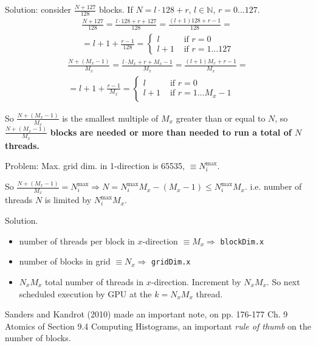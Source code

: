 \documentclass[10pt]{amsart}
\begin{document}
\begin{multicols*}{2}
Solution: consider $\frac{N+127}{128}$ blocks.  If $N = l\cdot 128 + r$, $l\in \mathbb{N}$, $r = 0 \dots 127$.
\[
\begin{gathered}
	\frac{N+127}{128} = \frac{ l \cdot 128 + r + 127 }{128} = \frac{ (l+1)128 + r- 1}{128} = \\
	= l+1 + \frac{r-1}{128} = \begin{cases}
		l & \text{ if } r= 0 \\
		l+1 & \text{ if } r = 1 \dots 127
	\end{cases}
\end{gathered}
\]
\[
\begin{gathered}
	\frac{ N + (M_x - 1) }{M_x} = \frac{ l\cdot M_x + r+ M_x - 1}{M_x} = \frac{ (l+1)M_x + r-1 }{M_x} = \\
	= l+1 + \frac{r-1}{M_x} = \begin{cases}
		l & \text{ if } r = 0 \\
		l +1 & \text{ if } r = 1 \dots M_x -1 
	\end{cases}
\end{gathered}
\]

So $\frac{N+(M_x-1)}{M_x}$ is the smallest multiple of $M_x$ greater than or equal to $N$, so $\frac{N + (M_x- 1)}{M_x}$ \textbf{blocks are needed or more than needed to run a total of $N$ threads.}


Problem: Max. grid dim. in 1-direction is 65535, $\equiv N_i^{\text{max}}$.

So $\frac{ N+ (M_x-1)}{M_x} = N_i^{\text{max}} \Longrightarrow N = N_i^{\text{max}} M_x - (M_x-1) \leq N_i^{\text{max}} M_x$.  i.e. number of threads $N$ is limited by $N_i^{\text{max}} M_x$.

Solution.

\begin{itemize}
	\item number of threads per block in $x$-direction $\equiv M_x \Longrightarrow $ \verb|blockDim.x| \\
	\item number of blocks in grid $\equiv N_x \Longrightarrow $ \verb|gridDim.x| 
	\item $N_x M_x$ total number of threads in $x$-direction.  Increment by $N_xM_x$.  So next scheduled execution by GPU at the $k= N_xM_x$ thread.  
\end{itemize}

Sanders and Kandrot (2010) \cite{SK2010} made an important note, on pp. 176-177 Ch. 9 Atomics of Section 9.4 Computing Histograms, an important \emph{rule of thumb} on the number of blocks.


\end{multicols*}
\end{document}
